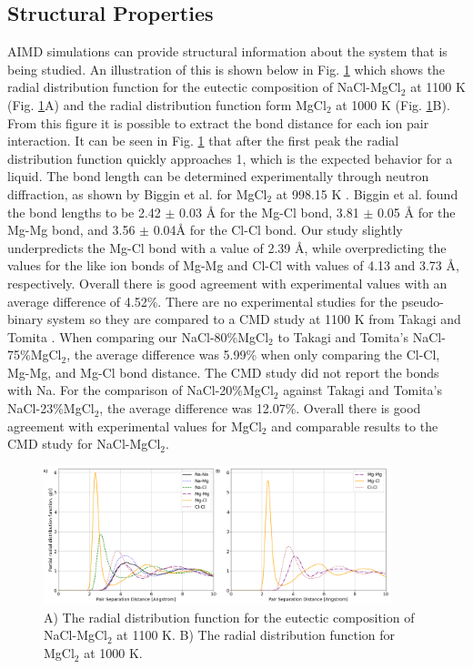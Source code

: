 \documentclass[review]{elsarticle}
\begin{document}
\FloatBarrier

\subsection{Structural Properties}

AIMD simulations can provide structural information about the system that is being studied. An illustration of this is shown below in Fig. \ref{fig:rdf} which shows the radial distribution function for the eutectic composition of NaCl-MgCl$_2$ at 1100 K (Fig. \ref{fig:rdf}A) and the radial distribution function form MgCl$_2$ at 1000 K (Fig. \ref{fig:rdf}B). From this figure it is possible to extract the bond distance for each ion pair interaction. It can be seen in Fig. \ref{fig:rdf} that after the first peak the radial distribution function quickly approaches 1, which is the expected behavior for a liquid. The bond length can be determined experimentally through neutron diffraction, as shown by Biggin et al. for MgCl$_2$ at 998.15 K \cite{biggin1984structures}. Biggin et al. found the bond lengths to be 2.42 $\pm$ 0.03 \r{A} for the Mg-Cl bond, 3.81 $\pm$ 0.05 \r{A} for the Mg-Mg bond, and  3.56 $\pm$ 0.04\r{A} for the Cl-Cl bond. Our study slightly underpredicts the Mg-Cl bond with a value of 2.39 \r{A}, while overpredicting the values for the like ion bonds of Mg-Mg and Cl-Cl with values of 4.13 and 3.73 \r{A}, respectively. Overall there is good agreement with experimental values with an average difference of 4.52\%. There are no experimental studies for the pseudo-binary system so they are compared to a CMD study at 1100 K from Takagi and Tomita \cite{takagi1993structure}. When comparing our NaCl-80\%MgCl$_2$ to Takagi and Tomita's NaCl-75\%MgCl$_2$, the average difference was 5.99\% when only comparing the Cl-Cl, Mg-Mg, and Mg-Cl bond distance. The CMD study did not report the bonds with Na. For the comparison of NaCl-20\%MgCl$_2$ against Takagi and Tomita's NaCl-23\%MgCl$_2$, the average difference was 12.07\%. Overall there is good agreement with experimental values for MgCl$_2$ and comparable results to the CMD study for NaCl-MgCl$_2$.

\begin{figure}[h]
 \centering
 \includegraphics[width=0.9\textwidth]{images/rdf_from_vasppy.png} 
 \caption{A) The radial distribution function for the eutectic composition of NaCl-MgCl$_2$ at 1100 K. B) The radial distribution function for MgCl$_2$ at 1000 K.}
 \label{fig:rdf}
\end{figure} 
\end{document}
